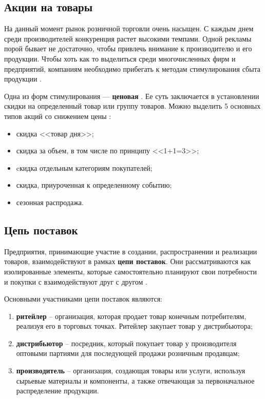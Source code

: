 \subsection{Акции на товары}

На данный момент рынок розничной торговли очень насыщен. 
С каждым днем среди производителей конкуренция растет высокими темпами. 
Одной рекламы порой бывает не достаточно, чтобы привлечь внимание к производителю и его продукции. 
Чтобы хоть как то выделиться среди многочисленных фирм и предприятий, компаниям необходимо прибегать к методам стимулирования сбыта продукции \cite{info_stock}.

Одна из форм стимулирования --- \textbf{ценовая} \cite{info_stock}. 
Ее суть заключается в установлении скидки на определенный товар или группу товаров.
Можно выделить 5 основных типов акций со снижением  цены \cite{info_promotion1, info_promotion2}:

\begin{itemize}[label*=--]
	\item скидка <<товар дня>>;
	\item скидка за объем, в том числе по принципу <<1+1=3>>;
	\item cкидка отдельным категориям покупателей;
	\item скидка, приуроченная к определенному событию;
	\item сезонная распродажа.
\end{itemize}

\subsection{Цепь поставок}

Предприятия, принимающие участие в создании, распространении и реализации товаров, взаимодействуют в рамках \textbf{цепи поставок}. Они рассматриваются как изолированные элементы, которые самостоятельно планируют свои потребности и покупки с взаимодействуют друг с другом \cite{info_supply_chain}.

Основными участниками цепи поставок являются:

\begin{enumerate}
	\item \textbf{ритейлер} -- организация, которая продает товар конечным потребителям, реализуя его в торговых точках. Ритейлер закупает товар у дистрибьютора;
	\item \textbf{дистрибьютор} -- посредник, который покупает товар у производителя оптовыми партиями для последующей продажи розничным продавцам;
	\item \textbf{производитель} -- организация, создающая товары или услуги, используя сырьевые материалы и компоненты, а также отвечающая за первоначальное распределение продукции.
\end{enumerate}

